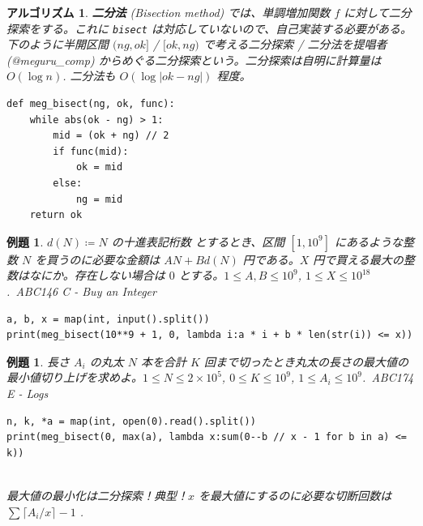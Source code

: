 \documentclass[12pt, a4j]{ltjsarticle}
\newtheorem{alg}[thm]{アルゴリズム}
\newtheorem{exm}[thm]{例題}
\begin{document}
\vspace{1cm}

\begin{alg}{\bf 二分法} (Bisection method) では、単調増加関数 $f$ に対して二分探索をする。これに \lstinline{bisect} は対応していないので、自己実装する必要がある。
下のように半開区間 $(ng, ok]$ / $[ok, ng)$ で考える二分探索 / 二分法を提唱者 (@meguru\_comp) からめぐる二分探索という。二分探索は自明に計算量は $O(\log n)$. 二分法も $O(\log |ok-ng|)$ 程度。
\\\upshape
\begin{lstlisting}
def meg_bisect(ng, ok, func):
    while abs(ok - ng) > 1:
        mid = (ok + ng) // 2
        if func(mid):
            ok = mid
        else:
            ng = mid
    return ok
\end{lstlisting}
\end{alg}

\vspace{1cm}

\begin{exm} $d(N)\coloneqq N$ の十進表記桁数 とするとき、区間 $[1,10^9]$ にあるような整数 $N$ を買うのに必要な金額は $AN+Bd(N)$ 円である。$X$ 円で買える最大の整数はなにか。存在しない場合は $0$ とする。$1 \le A,B \le 10^9$, $1 \le X \le 10^{18}$.\ \upshape ABC146 C - Buy an Integer\\
\begin{lstlisting}
a, b, x = map(int, input().split())
print(meg_bisect(10**9 + 1, 0, lambda i:a * i + b * len(str(i)) <= x))
\end{lstlisting}
\end{exm}

\vspace{1cm}

\begin{exm} 長さ $A_i$ の丸太 $N$ 本を合計 $K$ 回まで切ったとき丸太の長さの最大値の最小値切り上げを求めよ。$1 \leq N \leq 2 \times 10^5$, $0 \leq K \leq 10^9$, $1 \leq A_i \leq 10^9$.\ \upshape ABC174 E - Logs\\
\begin{lstlisting}
n, k, *a = map(int, open(0).read().split())
print(meg_bisect(0, max(a), lambda x:sum(0--b // x - 1 for b in a) <= k))
\end{lstlisting}\quad\\
最大値の最小化は二分探索！典型！$x$ を最大値にするのに必要な切断回数は $\sum \lceil A_i / x \rceil - 1$ .
\end{exm}

\vspace{1cm}
\end{document}
